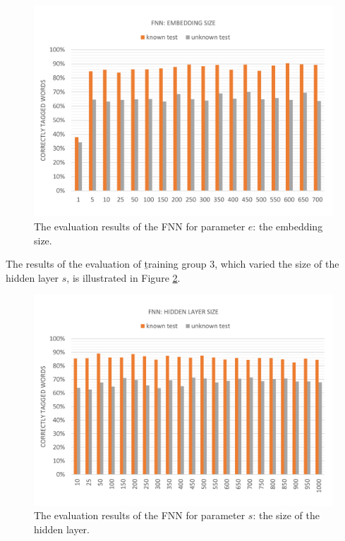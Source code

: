 \begin{figure}[H]
	\hspace{-5mm}\includegraphics[width=1.07\textwidth]{images/evaluation_fnn_e}
	\caption[FNN Evaluation: Number of Past Words]{The evaluation results of the FNN for parameter $e$: the embedding size.}
	\label{f.evaluation.fnn.e}
\end{figure}

The results of the evaluation of \b{training group 3}, which varied the size of the hidden layer $s$, is illustrated in Figure \ref{f.evaluation.fnn.s}.

\begin{figure}[H]
	\hspace{-5mm}\includegraphics[width=1.07\textwidth]{images/evaluation_fnn_s}
	\caption[FNN Evaluation: Hidden Layer Size]{The evaluation results of the FNN for parameter $s$: the size of the hidden layer.}
	\label{f.evaluation.fnn.s}
\end{figure}

